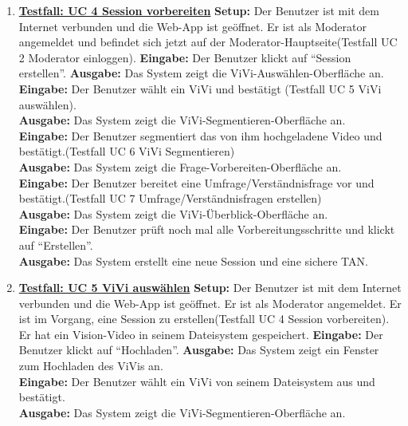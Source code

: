\begin{enumerate}
	\item \underline{\textbf{Testfall: UC 4 Session vorbereiten}} \linebreak
	\textbf{Setup:} Der Benutzer ist mit dem Internet verbunden und die Web-App ist geöffnet. Er ist als Moderator angemeldet und befindet sich jetzt auf der Moderator-Hauptseite(Testfall UC 2 Moderator einloggen).\linebreak
	\textbf{Eingabe:} Der Benutzer klickt auf ``Session erstellen''.\linebreak
	\textbf{Ausgabe:} Das System zeigt die ViVi-Auswählen-Oberfläche an. \\
	\textbf{Eingabe:} Der Benutzer wählt ein ViVi und bestätigt (Testfall UC 5 ViVi auswählen).\\
	\textbf{Ausgabe:} Das System zeigt die ViVi-Segmentieren-Oberfläche an. \\
	\textbf{Eingabe:} Der Benutzer segmentiert das von ihm hochgeladene Video und bestätigt.(Testfall UC 6 ViVi Segmentieren)\\
	\textbf{Ausgabe:} Das System zeigt die Frage-Vorbereiten-Oberfläche an.\\
	\textbf{Eingabe:} Der Benutzer bereitet eine Umfrage/Verständnisfrage vor und bestätigt.(Testfall UC 7 Umfrage/Verständnisfragen erstellen)\\
	\textbf{Ausgabe:} Das System zeigt die ViVi-Überblick-Oberfläche an.\\
	\textbf{Eingabe:} Der Benutzer prüft noch mal alle Vorbereitungsschritte und klickt auf ``Erstellen''.\\
	\textbf{Ausgabe:} Das System erstellt eine neue Session und eine sichere TAN.
	
	\item \underline{\textbf{Testfall: UC 5 ViVi auswählen}} \linebreak
	\textbf{Setup:} Der Benutzer ist mit dem Internet verbunden und die Web-App ist geöffnet. Er ist als Moderator angemeldet. Er ist im Vorgang, eine Session zu erstellen(Testfall UC 4 Session vorbereiten). Er hat ein Vision-Video in seinem Dateisystem gespeichert. \linebreak
	\textbf{Eingabe:} Der Benutzer klickt auf ``Hochladen''. \linebreak
	\textbf{Ausgabe:} Das System zeigt ein Fenster zum Hochladen des ViVis an.\\
	\textbf{Eingabe:} Der Benutzer wählt ein ViVi von seinem Dateisystem aus und bestätigt.\\
	\textbf{Ausgabe:} Das System zeigt die ViVi-Segmentieren-Oberfläche an.
	

\end{enumerate}
